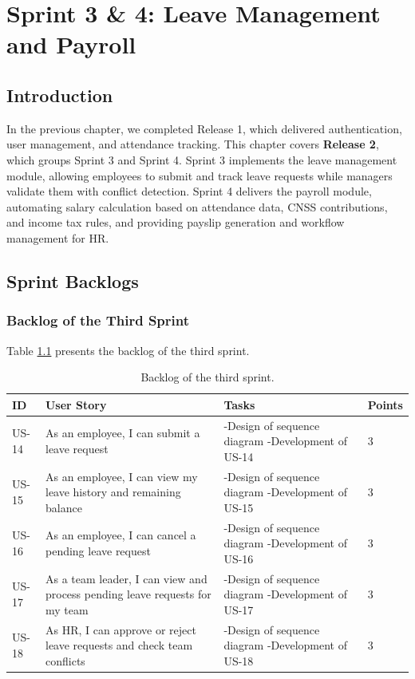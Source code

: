 \chapter{Sprint 3 \& 4: Leave Management and Payroll}

\section*{Introduction}
In the previous chapter, we completed Release 1, which delivered authentication, user management, and attendance tracking. This chapter covers \textbf{Release 2}, which groups Sprint 3 and Sprint 4. Sprint 3 implements the leave management module, allowing employees to submit and track leave requests while managers validate them with conflict detection. Sprint 4 delivers the payroll module, automating salary calculation based on attendance data, CNSS contributions, and income tax rules, and providing payslip generation and workflow management for HR.

\section{Sprint Backlogs}

\subsection{Backlog of the Third Sprint}
Table \ref{tab:leave-backlog} presents the backlog of the third sprint.

\begin{longtable}{
    |p{}
    |p{}|
    p{}|
    p{}| 
}
    \caption{Backlog of the third sprint.}
    \label{tab:leave-backlog}\\
    \hline
    ID & User Story & Tasks & Points \\
    \hline
    US-14 & As an employee, I can submit a leave request
    & -Design of sequence diagram\newline
-Development of US-14 & 3 \\
    \hline
    US-15 & As an employee, I can view my leave history and remaining balance
    & -Design of sequence diagram\newline
-Development of US-15 & 3 \\
    \hline
    US-16 & As an employee, I can cancel a pending leave request
    & -Design of sequence diagram\newline
-Development of US-16 & 3 \\
    \hline
    US-17 & As a team leader, I can view and process pending leave requests for my team
    & -Design of sequence diagram\newline
-Development of US-17 & 3 \\
    \hline
    US-18 & As HR, I can approve or reject leave requests and check team conflicts
    & -Design of sequence diagram\newline
-Development of US-18 & 3 \\
    \hline
\end{longtable}

